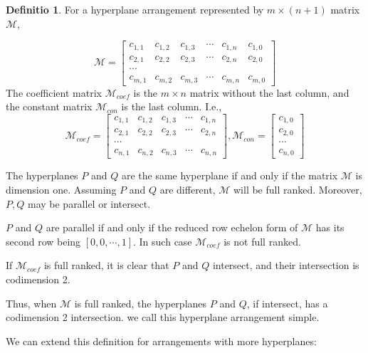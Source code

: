 \documentclass[12pt, a4paper]{article}
\theoremstyle{definition}
\newtheorem{definition}{Definitio}[section]
\theoremstyle{remark}
\begin{document}
\begin{definition}
	For a hyperplane arrangement represented by $m \times (n+1) $ matrix $\mathcal{M}$, 

	$$
	\mathcal{M} =
	\begin{bmatrix}
		c_{1,1} & c_{1,2} & c_{1,3} & \cdots & c_{1,n} & c_{1,0} \\
		c_{2,1} & c_{2,2} & c_{2,3} & \cdots & c_{2,n} & c_{2,0} 
			 \\ \cdots \\
		c_{m,1} & c_{m,2} & c_{m,3} & \cdots & c_{m,n} & c_{m,0}
	\end{bmatrix}
	$$
	The coefficient matrix $\mathcal{M}_{coef}$ is the $ m \times n$ matrix without the last column, and the constant matrix $\mathcal{M}_{con}$ is the last column. I.e., 
	$$
	\mathcal{M}_{coef} =
	\begin{bmatrix}
		c_{1,1} & c_{1,2} & c_{1,3} & \cdots & c_{1,n} \\
		c_{2,1} & c_{2,2} & c_{2,3} & \cdots & c_{2,n} 
			 \\ \cdots \\
		c_{n,1} & c_{n,2} & c_{n,3} & \cdots & c_{n,n}
	\end{bmatrix}
	, \mathcal{M}_{con} =
	\begin{bmatrix}
		c_{1,0} \\
		c_{2,0} \\
		\cdots \\
		c_{n,0}
	\end{bmatrix}
	$$
\end{definition}

The hyperplanes $P$ and $Q$ are the same hyperplane if and only if the matrix $\mathcal{M}$ is dimension one. 
Assuming $P$ and $Q$ are different, $\mathcal{M}$ will be full ranked. Moreover, $P, Q$ may be parallel or intersect. 

$P$ and $Q$ are parallel if and only if the reduced row echelon form of $\mathcal{M}$ has its second row being $[0, 0, \cdots, 1]$. In such case $\mathcal{M}_{coef}$ is not full ranked. 

If $\mathcal{M}_{coef}$ is full ranked, it is clear that $P$ and $Q$ intersect, and their intersection is codimension 2.

Thus, when $\mathcal{M}$ is full ranked, the hyperplanes $P$ and $Q$, if intersect, has a codimension 2 intersection. we call this hyperplane arrangement simple. 

We can extend this definition for arrangements with more hyperplanes:
\end{document}
